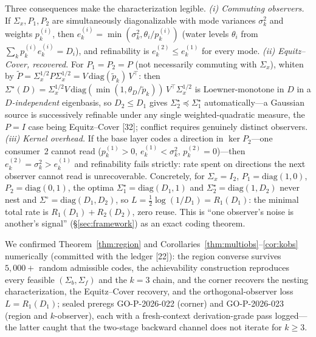 \documentclass[lettersize,onecolumn]{IEEEtran}
\theoremstyle{definition}
\theoremstyle{remark}
\begin{document}
Three consequences make the characterization legible. \emph{(i) Commuting observers.} If
$\Sigma_x,P_1,P_2$ are simultaneously diagonalizable with mode variances $\sigma_k^2$
and weights $p_k^{(i)}$, then $e_k^{(i)}=\min(\sigma_k^2,\theta_i/p_k^{(i)})$ (water
levels $\theta_i$ from $\sum_k p_k^{(i)}e_k^{(i)}=D_i$), and refinability is $e_k^{(2)}
\le e_k^{(1)}$ for every mode. \emph{(ii) Equitz--Cover, recovered.} For $P_1=P_2=P$ (not
necessarily commuting with $\Sigma_x$), whiten by $\tilde P=\Sigma_x^{1/2}P
\Sigma_x^{1/2}=V\,\mathrm{diag}(\tilde p_k)\,V^\top$: then $\Sigma^\star(D)=
\Sigma_x^{1/2}V\,\mathrm{diag}(\min(1,\theta_D/\tilde p_k))\,V^\top\Sigma_x^{1/2}$ is
Loewner-monotone in $D$ in a \emph{$D$-independent} eigenbasis, so $D_2\le D_1$ gives
$\Sigma_2^\star\preceq\Sigma_1^\star$ automatically---a Gaussian source is successively
refinable under any single weighted-quadratic measure, the $P=I$ case being
Equitz--Cover [32]; conflict requires genuinely distinct observers. \emph{(iii) Kernel overhead.} If the base layer codes a direction in
$\ker P_2$---one consumer~2 cannot read ($p_k^{(1)}>0$, $e_k^{(1)}<\sigma_k^2$,
$p_k^{(2)}=0$)---then $e_k^{(2)}=\sigma_k^2>e_k^{(1)}$ and refinability fails strictly:
rate spent on directions the next observer cannot read is unrecoverable. Concretely, for
$\Sigma_x=I_2$, $P_1=\mathrm{diag}(1,0)$, $P_2=\mathrm{diag}(0,1)$, the optima
$\Sigma_1^\star=\mathrm{diag}(D_1,1)$ and $\Sigma_2^\star=\mathrm{diag}(1,D_2)$ never
nest and $\Sigma^\circ=\mathrm{diag}(D_1,D_2)$, so $L=\tfrac12\log(1/D_1)=R_1(D_1)$: the
minimal total rate is $R_1(D_1)+R_2(D_2)$, zero reuse. This is ``one observer's noise is
another's signal'' (\S\ref{sec:framework}) as an exact coding theorem.

We confirmed Theorem~\ref{thm:region} and Corollaries~\ref{thm:multiobs}--\ref{cor:kobs}
numerically (committed with the ledger [22]): the region converse survives
$5{,}000+$ random admissible codes, the achievability construction reproduces every
feasible $(\Sigma_b,\Sigma_f)$ and the $k=3$ chain, and the corner recovers the nesting
characterization, the Equitz--Cover recovery, and the orthogonal-observer loss
$L=R_1(D_1)$; sealed preregs GO-P-2026-022 (corner) and GO-P-2026-023 (region and
$k$-observer), each with a fresh-context derivation-grade pass logged---the latter caught
that the two-stage backward channel does not iterate for $k\ge3$.
\end{document}
